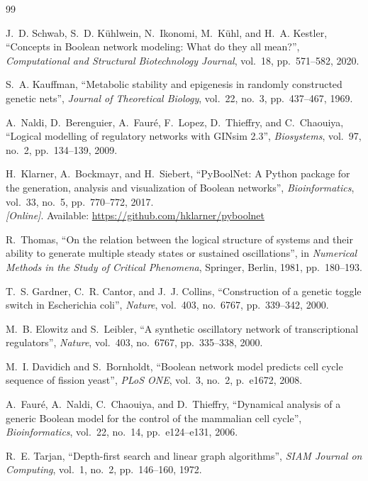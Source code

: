\documentclass[oneside,final]{hcmut-report}
\begin{document}
\begin{thebibliography}{99}

J.~D. Schwab, S.~D. Kühlwein, N.~Ikonomi, M.~Kühl, and H.~A. Kestler,
``Concepts in Boolean network modeling: What do they all mean?'',
\textit{Computational and Structural Biotechnology Journal}, vol.~18, pp.~571--582, 2020.

S.~A. Kauffman,
``Metabolic stability and epigenesis in randomly constructed genetic nets'',
\textit{Journal of Theoretical Biology}, vol.~22, no.~3, pp.~437--467, 1969.

A.~Naldi, D.~Berenguier, A.~Fauré, F.~Lopez, D.~Thieffry, and C.~Chaouiya,
``Logical modelling of regulatory networks with GINsim 2.3'',
\textit{Biosystems}, vol.~97, no.~2, pp.~134--139, 2009.

H.~Klarner, A.~Bockmayr, and H.~Siebert,
``PyBoolNet: A Python package for the generation, analysis and visualization of Boolean networks'',
\textit{Bioinformatics}, vol.~33, no.~5, pp.~770--772, 2017.
\\\textit{[Online]}. Available: \url{https://github.com/hklarner/pyboolnet}

R.~Thomas,
``On the relation between the logical structure of systems and their ability to generate multiple steady states or sustained oscillations'',
in \textit{Numerical Methods in the Study of Critical Phenomena}, Springer, Berlin, 1981, pp.~180--193.

T.~S. Gardner, C.~R. Cantor, and J.~J. Collins,
``Construction of a genetic toggle switch in Escherichia coli'',
\textit{Nature}, vol.~403, no.~6767, pp.~339--342, 2000.

M.~B. Elowitz and S.~Leibler,
``A synthetic oscillatory network of transcriptional regulators'',
\textit{Nature}, vol.~403, no.~6767, pp.~335--338, 2000.

M.~I. Davidich and S.~Bornholdt,
``Boolean network model predicts cell cycle sequence of fission yeast'',
\textit{PLoS ONE}, vol.~3, no.~2, p.~e1672, 2008.

A.~Fauré, A.~Naldi, C.~Chaouiya, and D.~Thieffry,
``Dynamical analysis of a generic Boolean model for the control of the mammalian cell cycle'',
\textit{Bioinformatics}, vol.~22, no.~14, pp.~e124--e131, 2006.

R.~E. Tarjan,
``Depth-first search and linear graph algorithms'',
\textit{SIAM Journal on Computing}, vol.~1, no.~2, pp.~146--160, 1972.


\end{thebibliography}
\end{document}
